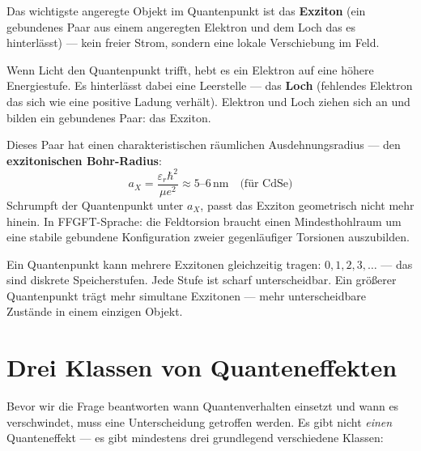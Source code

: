 Das wichtigste angeregte Objekt im Quantenpunkt ist das
\textbf{Exziton} (ein gebundenes Paar aus einem angeregten
Elektron und dem Loch das es hinterlässt) ---
kein freier Strom, sondern eine lokale Verschiebung im Feld.

Wenn Licht den Quantenpunkt trifft, hebt es ein Elektron
auf eine höhere Energiestufe. Es hinterlässt dabei eine
Leerstelle --- das \textbf{Loch} (fehlendes Elektron das sich
wie eine positive Ladung verhält). Elektron und Loch
ziehen sich an und bilden ein gebundenes Paar: das Exziton.

Dieses Paar hat einen charakteristischen räumlichen Ausdehnungsradius
--- den \textbf{exzitonischen Bohr-Radius}:
\begin{equation}
  a_X = \frac{\varepsilon_r \hbar^2}{\mu e^2} \approx 5\text{--}6\,\text{nm}
  \quad \text{(für CdSe)}
\end{equation}
Schrumpft der Quantenpunkt unter $a_X$, passt das Exziton
geometrisch nicht mehr hinein. In FFGFT-Sprache: die Feldtorsion
braucht einen Mindesthohlraum um eine stabile gebundene Konfiguration
zweier gegenläufiger Torsionen auszubilden.

Ein Quantenpunkt kann mehrere Exzitonen gleichzeitig tragen:
$0, 1, 2, 3, \ldots$ --- das sind diskrete Speicherstufen.
Jede Stufe ist scharf unterscheidbar. Ein größerer Quantenpunkt
trägt mehr simultane Exzitonen --- mehr unterscheidbare Zustände
in einem einzigen Objekt.

\section{Drei Klassen von Quanteneffekten}
\label{sec:drei-klassen}

Bevor wir die Frage beantworten wann Quantenverhalten
einsetzt und wann es verschwindet, muss eine Unterscheidung
getroffen werden. Es gibt nicht \emph{einen} Quanteneffekt ---
es gibt mindestens drei grundlegend verschiedene Klassen:

\begin{center}
\end{center}

